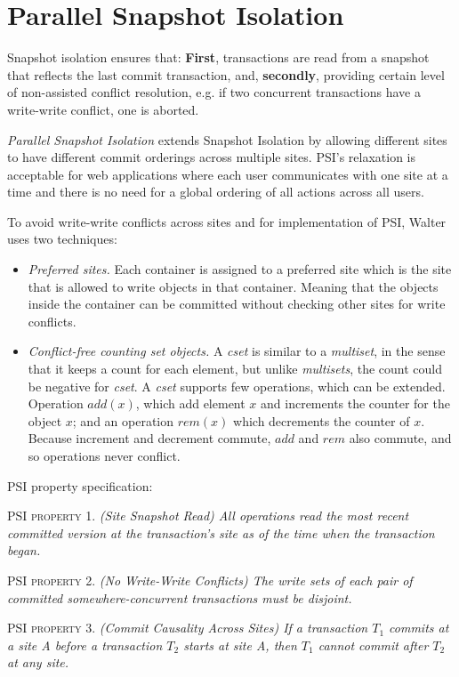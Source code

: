 \documentclass[a4paper]{article}
\begin{document}
\section{Parallel Snapshot Isolation}
Snapshot isolation ensures that: \textbf{First}, transactions are read from a snapshot that reflects the last commit transaction, and, \textbf{secondly}, providing certain level of non-assisted conflict resolution, e.g. if two concurrent transactions have a write-write conflict, one is aborted.
 
\textit{Parallel Snapshot Isolation} extends Snapshot Isolation by allowing different sites to have different commit orderings across multiple sites. PSI's relaxation is acceptable for web applications where each user communicates with one site at a time and there is no need for a global ordering of all actions across all users. 

To avoid write-write conflicts across sites and for implementation of PSI, Walter uses two techniques:
\begin{itemize}
\item \textit{Preferred sites.} Each container is assigned to a preferred site which is the site that is allowed to write objects in that container. Meaning that the objects inside the container can be committed without checking other sites for write conflicts.
\item \textit{Conflict-free counting set objects.} A \textit{cset} is similar to a \textit{multiset}, in the sense that it keeps a count for each element, but unlike \textit{multisets}, the count could be negative for \textit{cset}. A \textit{cset} supports few operations, which can be extended. Operation $add(x)$, which add element $x$ and increments the counter for the object $x$; and an operation $rem(x)$ which decrements the counter of $x$. Because increment and decrement commute, $add$ and $rem$ also commute, and so operations never conflict. 
\end{itemize}

PSI property specification:

PSI \textsc{property} 1. \textit{(Site Snapshot Read) All operations read the most recent committed version at the transaction's site as of the time when the transaction began.}

PSI \textsc{property} 2. \textit{(No Write-Write Conflicts) The write sets of each pair of committed somewhere-concurrent transactions must be disjoint.}

PSI \textsc{property} 3. \textit{(Commit Causality Across Sites) If a transaction $T_{1}$ commits at a site A before a transaction $T_{2}$ starts at site A, then $T_{1}$ cannot commit after $T_{2}$ at any site.}
\end{document}
